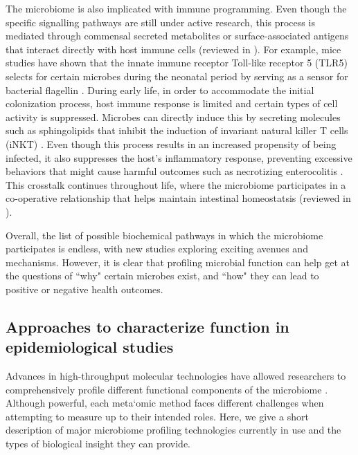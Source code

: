 The microbiome is also implicated with immune programming. Even though the specific signalling pathways are still under active research, this process is mediated through commensal secreted metabolites or surface-associated antigens that interact directly with host immune cells (reviewed in \cite{belkaid2014role}). For example, mice studies have shown that the innate immune receptor Toll-like receptor 5 (TLR5) selects for certain microbes during the neonatal period by serving as a sensor for bacterial flagellin \cite{fulde2018neonatal}. During early life, in order to accommodate the initial colonization process, host immune response is limited and certain types of cell activity is suppressed. Microbes can directly induce this by secreting molecules such as sphingolipids that inhibit the induction of invariant natural killer T cells (iNKT) \cite{an2014sphingolipids}. Even though this process results in an increased propensity of being infected, it also suppresses the host's inflammatory response, preventing excessive behaviors that might cause harmful outcomes such as necrotizing enterocolitis \cite{neu2011necrotizing}. This crosstalk continues throughout life, where the microbiome participates in a co-operative relationship that helps maintain intestinal homeostatsis (reviewed in \cite{zheng2020interaction}). 

Overall, the list of possible biochemical pathways in which the microbiome participates is endless, with new studies exploring exciting avenues and mechanisms. However, it is clear that profiling microbial function can help get at the questions of ``why" certain microbes exist, and ``how" they can lead to positive or negative health outcomes.  

\subsection{Approaches to characterize function in epidemiological studies}

Advances in high-throughput molecular technologies have allowed researchers to comprehensively profile different functional components of the microbiome \cite{foxman2015use}. Although powerful, each meta`omic method faces different challenges when attempting to measure up to their intended roles. Here, we give a short description of major microbiome profiling technologies currently in use and the types of biological insight they can provide.  

